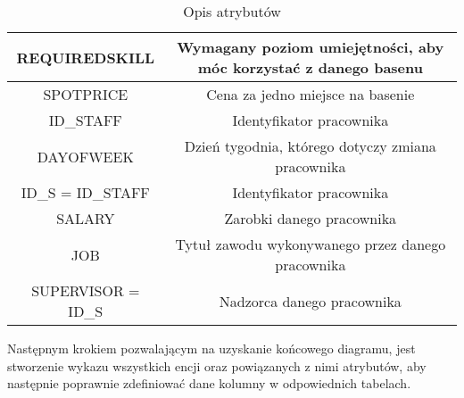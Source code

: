 \documentclass[a4paper]{article}
\begin{document}
\begin{table}[htbp]
{\begin{tabular}{|c|c|}
REQUIREDSKILL          & Wymagany poziom umiejętności, aby móc korzystać z danego basenu                 \\ \hline
SPOTPRICE              & Cena za jedno miejsce na basenie                                                \\ \hline
ID\_STAFF              & Identyfikator pracownika                                                        \\ \hline
DAYOFWEEK              & Dzień tygodnia, którego dotyczy zmiana pracownika                               \\ \hline
ID\_S = ID\_STAFF      & Identyfikator pracownika                                                        \\ \hline
SALARY                 & Zarobki danego pracownika                                                       \\ \hline
JOB                    & Tytuł zawodu wykonywanego przez danego pracownika                               \\ \hline
SUPERVISOR = ID\_S     & Nadzorca danego pracownika                                                      \\ \hline
\end{tabular}
}
\caption{Opis atrybutów}
\end{table}

Następnym krokiem pozwalającym na uzyskanie końcowego diagramu, jest stworzenie wykazu wszystkich encji oraz powiązanych z nimi atrybutów, aby następnie poprawnie zdefiniować dane kolumny w odpowiednich tabelach.

\newpage

\begin{table}[htbp]
\centering
{}
\caption{Wykaz encji i powiązanych z nimi atrybutów}
\end{table}
\end{document}
